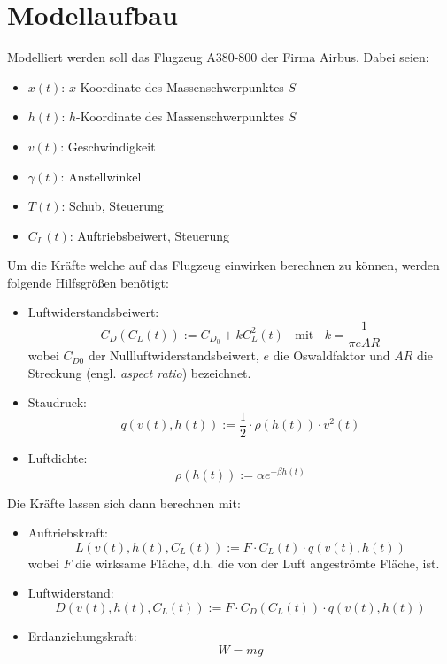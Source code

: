 \chapter{Modellaufbau}
Modelliert werden soll das Flugzeug A380-800 der Firma Airbus. Dabei seien:
\begin{itemize}
\item $x(t)$: $x$-Koordinate des Massenschwerpunktes $S$
%
\item $h(t)$: $h$-Koordinate des Massenschwerpunktes $S$
%
\item $v(t)$: Geschwindigkeit
%
\item $\gamma(t)$: Anstellwinkel
%
\item $T(t)$: Schub, Steuerung
%
\item $C_L(t)$: Auftriebsbeiwert, Steuerung
\end{itemize}
Um die Kräfte welche auf das Flugzeug einwirken berechnen zu können, werden folgende Hilfsgrößen benötigt:
\begin{itemize}
\item Luftwiderstandsbeiwert: \[C_D(C_L(t)) := C_{D_0} + k C^2_L(t) \ \ \ \ \text{mit} \ \ \ \ k = \dfrac{1}{\pi e AR}\] wobei $C_{D0}$ der Nullluftwiderstandsbeiwert, $e$ die Oswaldfaktor und $AR$ die Streckung (engl. \textit{aspect ratio}) bezeichnet.
%
\item Staudruck: \[q(v(t), h(t)) := \dfrac{1}{2} \cdot \rho(h(t)) \cdot v^2(t)\]
%
\item Luftdichte: \[\rho(h(t)) := \alpha e^{-\beta h(t)}\]
\end{itemize}
Die Kräfte lassen sich dann berechnen mit:
\begin{itemize}
\item Auftriebskraft: \[L(v(t), h(t), C_L(t)) := F \cdot C_L(t) \cdot q(v(t), h(t))\] wobei $F$ die wirksame Fläche, d.h. die von der Luft angeströmte Fläche, ist.
%
\item Luftwiderstand: \[D(v(t), h(t), C_L(t)) := F \cdot C_D(C_L(t)) \cdot q(v(t), h(t))\]
\item Erdanziehungskraft: \[W = mg\]
\end{itemize}

